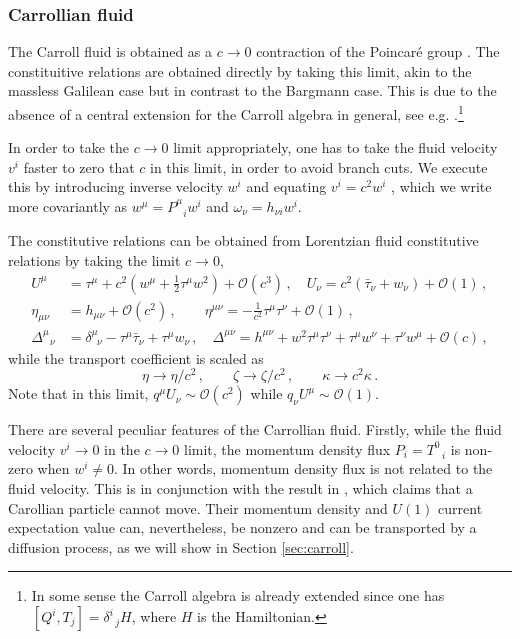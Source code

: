 \documentclass[superscriptaddress,prd,nofootinbib,preprintnumbers,longbibliography,11pt,eqsecnum]{revtex4-1}
\def\CO{\mathcal{O}}
\begin{document}
\subsubsection{Carrollian fluid}\label{sec:car_intro}
The Carroll fluid is obtained as a $c\to0$ contraction of the Poincar\'{e} group \cite{Ciambelli:2018xat,Ciambelli:2018wre,deBoer:2017ing}. The constituitive relations are obtained directly by taking this limit, akin to the massless Galilean case but in contrast to the Bargmann case. This is due to the absence of a central extension for the Carroll algebra in general, see e.g. \cite{Bergshoeff:2017btm,Hartong:2015xda}.\footnote{In some sense the Carroll algebra is already extended since one has $[Q^{i},T_{j}]=\delta^{i}_{\;\;j}H$, where $H$ is the Hamiltonian.}

In order to take the $c\to0$ limit appropriately, one has to take the fluid velocity $v^{i}$ faster to zero that $c$ in this limit, in order to avoid branch cuts. We execute this by introducing inverse velocity $w^{i}$ and equating $v^{i}=c^{2}w^{i}$ \cite{levy1965nouvelle}, which we write more covariantly as $w^{\mu}=P^{\mu}_{\;\;\,i}w^{i}$ and $\omega_{\nu}=h_{\nu i}w^{i}$.
 
The constitutive relations can be obtained from Lorentzian fluid constitutive relations by taking the limit $c\to 0$,
\begin{equation}\label{eq:cToZeroLimit}
	\begin{aligned}
	U^\mu 
	&= 
	\tau^\mu + c^2 \left( w^\mu + \frac{1}{2}\tau^\mu w^2 \right) + \CO(c^3)\, ,\quad
  	U_\nu 
	= 
	c^2 \left( \bar\tau_\nu + w_\nu \right)+ \CO(1)\, ,
  	\\
	\eta_{\mu \nu} 
	&= 
	h_{\mu \nu} + \CO(c^2)\, , 
	\qquad 
	\eta^{\mu \nu} 
	= 
	-\frac{1}{c^2}\tau^\mu \tau^\nu + \CO(1) \, ,
	\\
	\Delta^{\mu}_{\;\;\,\nu} 
	&= 
	\delta^{\mu}_{\;\; \nu} - \tau^\mu \bar\tau_\nu + \tau^\mu w_\nu\,,
	\quad
	\Delta^{\mu \nu} 
	= 
	h^{\mu \nu} +w^2 \tau^\mu \tau^\nu + \tau^{\mu}w^{\nu}+\tau^{\nu}w^{\mu} + \CO(c) 
	\,,
	\end{aligned}
\end{equation}
while the transport coefficient is scaled as 
\begin{equation}
  \eta \to \eta/c^2 \, ,\qquad \zeta \to \zeta/c^2 \,, \qquad \kappa\to c^2 \kappa \,.
  \end{equation}
Note that in this limit, $q^\mu U_\nu \sim \CO(c^2)$ while $q_\nu U^\mu \sim \CO(1)$. 

There are several peculiar features of the Carrollian fluid. Firstly, while the fluid velocity $v^i \to 0$ in the $c\to 0$ limit, the momentum density flux $P_i = T^0_{\;\;\, i}$ is non-zero when $w^i \ne 0$. In other words, momentum density flux is not related to the fluid velocity. This is in conjunction with the result in \cite{Bergshoeff:2014jla}, which claims that a Carollian particle cannot move. Their momentum density and $U(1)$ current expectation value can, nevertheless, be nonzero and can be transported by a diffusion process, as we will show in Section \ref{sec:carroll}.
\end{document}

